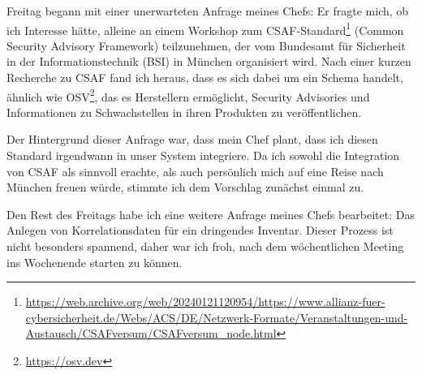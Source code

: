 \sweekdaymarginpar{\weekdayFridayLong}

Freitag begann mit einer unerwarteten Anfrage meines Chefs:
Er fragte mich, ob ich Interesse hätte, alleine an einem Workshop zum CSAF-Standard\footnote{\url{https://web.archive.org/web/20240121120954/https://www.allianz-fuer-cybersicherheit.de/Webs/ACS/DE/Netzwerk-Formate/Veranstaltungen-und-Austausch/CSAFversum/CSAFversum_node.html}} (Common Security Advisory Framework) teilzunehmen, der vom Bundesamt für Sicherheit in der Informationstechnik (BSI) in München organisiert wird.
Nach einer kurzen Recherche zu CSAF fand ich heraus, dass es sich dabei um ein Schema handelt, ähnlich wie OSV\footnote{\url{https://osv.dev}}, das es Herstellern ermöglicht, Security Advisories und Informationen zu Schwachstellen in ihren Produkten zu veröffentlichen.

Der Hintergrund dieser Anfrage war, dass mein Chef plant, dass ich diesen Standard irgendwann in unser System integriere.
Da ich sowohl die Integration von CSAF als sinnvoll erachte, als auch persönlich mich auf eine Reise nach München freuen würde, stimmte ich dem Vorschlag zunächst einmal zu.

Den Rest des Freitags habe ich eine weitere Anfrage meines Chefs bearbeitet:
Das Anlegen von Korrelationsdaten für ein dringendes Inventar.
Dieser Prozess ist nicht besonders spannend, daher war ich froh, nach dem wöchentlichen Meeting ins Wochenende starten zu können.

